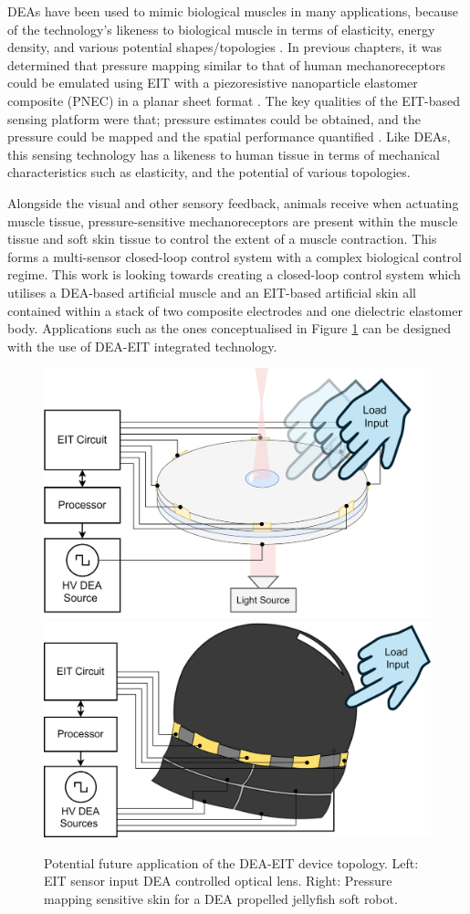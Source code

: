 DEAs have been used to mimic biological muscles in many applications, because of the technology's likeness to biological muscle in terms of elasticity, energy density, and various potential shapes/topologies \cite{Rosset2016, Hajiesmaili2021, Guo2021}. In previous chapters, it was determined that pressure mapping similar to that of human mechanoreceptors could be emulated using EIT with a piezoresistive nanoparticle elastomer composite (PNEC) in a planar sheet format \cite{Ellingham2022}. The key qualities of the EIT-based sensing platform were that; pressure estimates could be obtained, and the pressure could be mapped and the spatial performance quantified \cite{Ellingham2024}. Like DEAs, this sensing technology has a likeness to human tissue in terms of mechanical characteristics such as elasticity, and the potential of various topologies.

Alongside the visual and other sensory feedback, animals receive when actuating muscle tissue, pressure-sensitive mechanoreceptors are present within the muscle tissue \cite{Iheanacho2023} and soft skin tissue to control the extent of a muscle contraction. This forms a multi-sensor closed-loop control system with a complex biological control regime. This work is looking towards creating a closed-loop control system which utilises a DEA-based artificial muscle and an EIT-based artificial skin all contained within a stack of two composite electrodes and one dielectric elastomer body. Applications such as the ones conceptualised in Figure \ref{fig:dea-eit-applications} can be designed with the use of DEA-EIT integrated technology.

\begin{figure}[H]
	\centering
	\includegraphics[width=0.41\linewidth]{Figures/DEA-EIT_lens_application_lit.png}
	\hspace{1cm}
	\includegraphics[width=0.44\linewidth]{Figures/DEA-EIT_jellyfish_application.png}
	\vspace{0.3cm}
	\caption{Potential future application of the DEA-EIT device topology. Left: EIT sensor input DEA controlled optical lens. Right: Pressure mapping sensitive skin for a DEA propelled jellyfish soft robot.}
	\label{fig:dea-eit-applications}
\end{figure}


